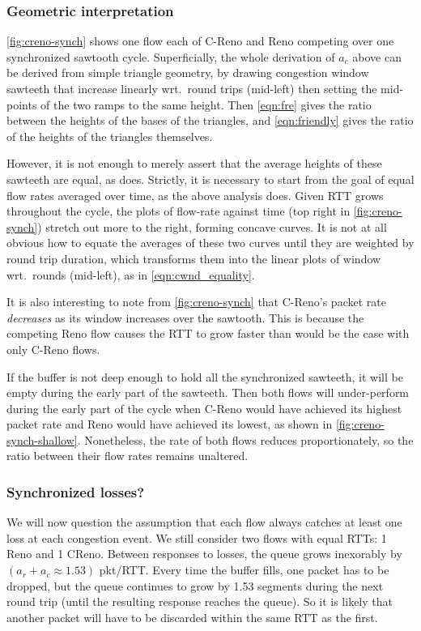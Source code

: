 \subsubsection{Geometric interpretation} 
\autoref{fig:creno-synch} shows one flow each of C-Reno and Reno competing over one synchronized sawtooth cycle. Superficially, the whole derivation of \(a_c\) above can be derived from simple triangle geometry, by drawing congestion window sawteeth that increase linearly wrt.\ round trips (mid-left) then setting the mid-points of the two ramps to the same height. Then \autoref{eqn:fre} gives the ratio between the heights of the bases of the triangles, and \autoref{eqn:friendly} gives the ratio of the heights of the triangles themselves.

However, it is not enough to merely assert that the average heights of these sawteeth are equal, as \cite{Floyd00:Eqn_v_AIMD_cc} does. Strictly, it is necessary to start from the goal of equal flow rates averaged over time, as the above analysis does. Given RTT grows throughout the cycle, the plots of flow-rate against time (top right in \autoref{fig:creno-synch}) stretch out more to the right, forming concave curves. It is not at all obvious how to equate the averages of these two curves until they are weighted by round trip duration, which transforms them into the linear plots of window wrt.\ rounds (mid-left), as in \autoref{eqn:cwnd_equality}.

It is also interesting to note from \autoref{fig:creno-synch} that C-Reno's packet rate \emph{decreases} as its window increases over the sawtooth. This is because the competing Reno flow causes the RTT to grow faster than would be the case with only C-Reno flows. 

If the buffer is not deep enough to hold all the synchronized sawteeth, it will be empty during the early part of the sawteeth. Then both flows will under-perform during the early part of the cycle when C-Reno would have achieved its highest packet rate and Reno would have achieved its lowest, as shown in \autoref{fig:creno-synch-shallow}. Nonetheless, the rate of both flows reduces proportionately, so the ratio between their flow rates remains unaltered.

\subsubsection{Synchronized losses?}
We will now question the assumption that each flow always catches at least one loss at each congestion event. We still consider two flows with equal RTTs: 1 Reno and 1 CReno. Between responses to losses, the queue grows inexorably by \((a_r + a_c \approx 1.53)\) pkt/RTT. Every time the buffer fills, one packet has to be dropped, but the queue continues to grow by 1.53 segments during the next round trip (until the resulting response reaches the queue). So it is likely that another packet will have to be discarded within the same RTT as the first.

